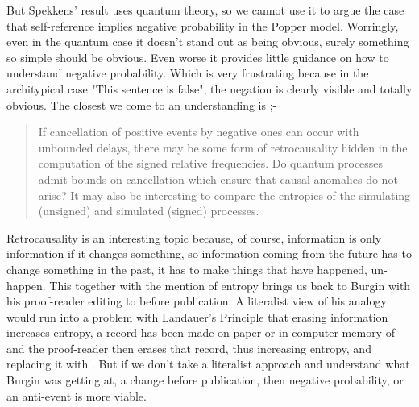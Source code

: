 But Spekkens' result uses quantum theory, so we cannot use it to argue the case that self-reference implies negative probability in the Popper model. Worringly, even in the quantum case it doesn't stand out as being obvious, surely something so simple should be obvious. Even worse it provides little guidance on how to understand negative probability. Which is very frustrating because in the architypical case "This sentence is false", the negation is clearly visible and totally obvious. The closest we come to an understanding is ;-
\begin{quotation}
    If cancellation of positive events by negative ones can occur with unbounded delays, there may be some form of retrocausality hidden in the computation of the signed relative frequencies. Do quantum processes admit bounds on cancellation which ensure that causal anomalies do not arise? It may also be interesting to compare the entropies of the simulating (unsigned) and simulated (signed) processes.
 \par
\hfill \autocite{Abramsky2014}
\end{quotation}
Retrocausality is an interesting topic because, of course, information is only information if it changes something, so information coming from the future has to change something in the past, it has to make things that have happened, un-happen. This together with the mention of entropy brings us back to Burgin with his proof-reader editing  to  before publication. A literalist view of his analogy would run into a problem with Landauer's Principle \autocite{Landauer_1961} that erasing information increases entropy, a record has been made on paper or in computer memory of  and the proof-reader then erases that record, thus increasing entropy, and replacing it with . But if we don't take a literalist approach and understand what Burgin was getting at, a change before publication, then negative probability, or an anti-event is more viable. 
